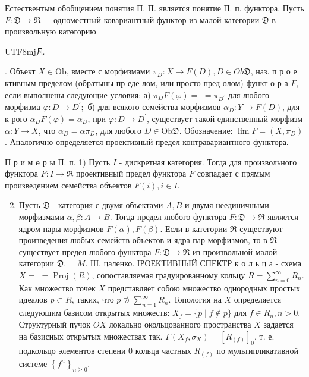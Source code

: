 \documentclass[10pt]{article}
\begin{document}
Естествентым обобщением понятия П. П. является понятие П. п. функтора. Пусть $F: \mathfrak{D} \rightarrow \mathfrak{\Re}-$ одноместный ковариантный функтор из малой категории $\mathfrak{D}$ в произвольную катөгорию \begin{CJK}{UTF8}{mj}凡\end{CJK}. Объект $X \in \mathrm{Ob}$, вместе с морфизмами $\pi_{D}: X \rightarrow F(D), D \in O b \mathfrak{D}$, наз. п р о е ктивным пределом (обратыны пр еде лом, или просто пред өлом) функт о р а $F$, если выполнены следующие условия: а) $\pi_{D} F(\varphi)=$ $=\pi_{D^{\prime}}$ для любого морфизма $\varphi: D \rightarrow D^{\prime} ;$ б) для всякого семейства морфизмов $\alpha_{D}: Y \rightarrow F(D)$, для к-рого $\alpha_{D} F(\varphi)=\alpha_{D}$, при $\varphi: D \rightarrow D^{\prime}$, существует такой единственный морфизм $\alpha: Y \rightarrow X$, что $\alpha_{D}=\alpha \pi_{D}$, для любого $D \in \mathrm{Ob} \mathfrak{D}$. Обозначение: $\lim F=\left(X, \pi_{D}\right)$. Аналогично определяется проективный предел контравариантного функтора.



П р и м ө р ы П. п. 1) Пусть $I$ - дискретная категория. Тогда для произвольного функтора $F: I \rightarrow \Re$ проективный предел функтора $F$ совпадает с прямым произведением семейства объектов $F(i), i \in I$.



\begin{enumerate}

  \setcounter{enumi}{1}

  \item Пусть $\mathfrak{D}$ - категория с двумя объектами $A, B$ и двумя неединичными морфизмами $\alpha, \beta: A \rightarrow B$. Тогда предел любого функтора $F: \mathfrak{D} \rightarrow \mathfrak{R}$ является ядром пары морфизмов $F(\alpha), F(\beta)$. Если в категории $\mathfrak{\Re}$ существуют произведения любых семейств объектов и ядра пар морфизмов, то в $\Re$ существует предел любого функтора $F: \mathfrak{D} \rightarrow \mathbb{\Re}$ из произвольной малой категории $\mathfrak{D}$. $\quad M$. Ш. цаленко. ІРОЕКТИВНЫЙ СПЕКТР к о л ь ц а - схема $X=$ $=\operatorname{Proj}(R)$, сопоставляемая градуированному кольцу $R=\sum_{n=0}^{\infty} R_{n}$. Как множество точек $X$ представляет собою множество однородных простых идеалов $p \subset R$, таких, что $p \not \supset \sum_{n=1}^{\infty} R_{n}$. Топология на $X$ определяется следующим базисом открытых множеств: $X_{f}=\{p \mid f \notin p\}$ для $f \in R_{n}, n>0$. Структурный пучок $\widehat{O} X$ локально окольцованного пространства $X$ задается на базисных открытых множествах так. $\Gamma\left(X_{f}, \sigma_{X}\right)=\left[R_{(f)}\right]_{0}$, т. е. подкольцо элементов степени 0 кольца частных $R_{(f)}$ по мультипликативной системе $\left\{f^{n}\right\}_{n \geqslant 0}$.

\end{enumerate}
\end{document}

